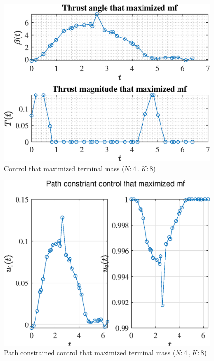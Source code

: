 \documentclass[]{article}
\begin{document}
	\begin{figure}
		\centering
		\includegraphics[scale=0.75]{control_N4_K8_C3_mf.eps}
		\caption{Control that maximized terminal mass (\(N:4\ , K:8\))}
		\label{fig:control_N4_K8_C3_mf}
	\end{figure}
	\begin{figure}
		\centering
		\includegraphics[scale=0.75]{path_N4_K8_C3_mf.eps}
		\caption{Path constrained control that maximized terminal mass (\(N:4\ , K:8\))}
		\label{fig:path_N4_K8_C3_mf}
	\end{figure}
\end{document}

